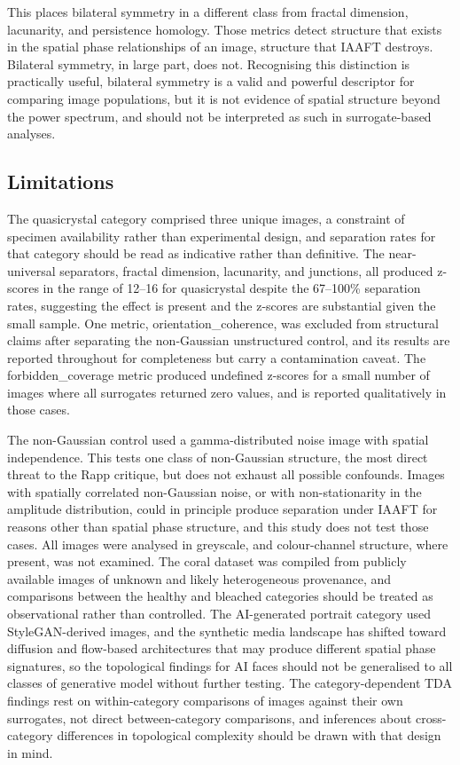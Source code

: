 \documentclass[a4paper,12pt]{article}
\begin{document}
This places bilateral symmetry in a different class from fractal dimension, lacunarity, and persistence homology. Those metrics detect structure that exists in the spatial phase relationships of an image, structure that IAAFT destroys. Bilateral symmetry, in large part, does not. Recognising this distinction is practically useful, bilateral symmetry is a valid and powerful descriptor for comparing image populations, but it is not evidence of spatial structure beyond the power spectrum, and should not be interpreted as such in surrogate-based analyses.

\subsection{Limitations}

The quasicrystal category comprised three unique images, a constraint of specimen availability rather than experimental design, and separation rates for that category should be read as indicative rather than definitive. The near-universal separators, fractal dimension, lacunarity, and junctions, all produced z-scores in the range of 12--16 for quasicrystal despite the 67--100\% separation rates, suggesting the effect is present and the z-scores are substantial given the small sample. One metric, orientation\_coherence, was excluded from structural claims after separating the non-Gaussian unstructured control, and its results are reported throughout for completeness but carry a contamination caveat. The forbidden\_coverage metric produced undefined z-scores for a small number of images where all surrogates returned zero values, and is reported qualitatively in those cases.

The non-Gaussian control used a gamma-distributed noise image with spatial independence. This tests one class of non-Gaussian structure, the most direct threat to the Rapp critique, but does not exhaust all possible confounds. Images with spatially correlated non-Gaussian noise, or with non-stationarity in the amplitude distribution, could in principle produce separation under IAAFT for reasons other than spatial phase structure, and this study does not test those cases. All images were analysed in greyscale, and colour-channel structure, where present, was not examined. The coral dataset was compiled from publicly available images of unknown and likely heterogeneous provenance, and comparisons between the healthy and bleached categories should be treated as observational rather than controlled. The AI-generated portrait category used StyleGAN-derived images, and the synthetic media landscape has shifted toward diffusion and flow-based architectures that may produce different spatial phase signatures, so the topological findings for AI faces should not be generalised to all classes of generative model without further testing. The category-dependent TDA findings rest on within-category comparisons of images against their own surrogates, not direct between-category comparisons, and inferences about cross-category differences in topological complexity should be drawn with that design in mind.
\end{document}
